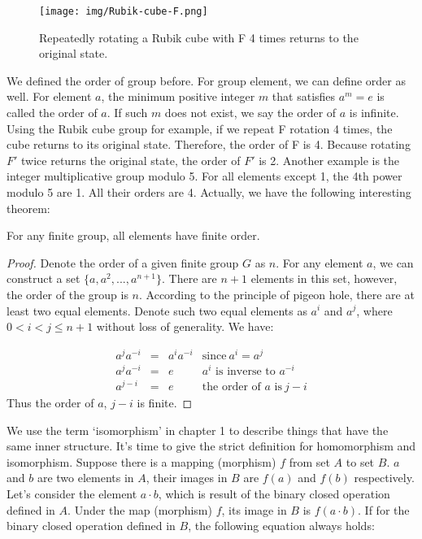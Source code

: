 \documentclass[b5paper]{article}
\begin{document}
\begin{figure}[htbp]
 \centering
 \texttt{[image: img/Rubik-cube-F.png]}
 \caption{Repeatedly rotating a Rubik cube with F 4 times returns to the original state.}
 \label{fig:Rubik-cube-F}
\end{figure}

We defined the order of group before. For group element, we can define order as well. For element $a$, the minimum positive integer $m$ that satisfies $a^m = e$ is called the order of $a$. If such $m$ does not exist, we say the order of $a$ is infinite. Using the Rubik cube group for example, if we repeat F rotation 4 times, the cube returns to its original state. Therefore, the order of F is 4. Because rotating $F'$ twice returns the original state, the order of $F'$ is 2. Another example is the integer multiplicative group modulo 5. For all elements except 1, the 4th power modulo 5 are 1. All their orders are 4. Actually, we have the following interesting theorem:

\begin{theorem}
For any finite group, all elements have finite order.
\end{theorem}

\begin{proof}
Denote the order of a given finite group $G$ as $n$. For any element $a$, we can construct a set $\{a, a^2, ..., a^{n+1}\}$. There are $n + 1$ elements in this set, however, the order of the group is $n$. According to the principle of pigeon hole, there are at least two equal elements. Denote such two equal elements as $a^i$ and $a^j$, where $0 < i < j \leq n + 1$ without loss of generality. We have:

\[
\begin{array}{rcll}
a^ja^{-i} & = & a^{i}a^{-i} & \text{since}\ a^i = a^j \\
a^ja^{-i} & = & e & \text{$a^i$ is inverse to $a^{-i}$} \\
a^{j-i} & = & e & \text{the order of $a$ is}\ j - i
\end{array}
\]
Thus the order of $a$, $j - i$ is finite.
\end{proof}

We use the term `isomorphism' in chapter 1 to describe things that have the same inner structure. It's time to give the strict definition for homomorphism and isomorphism. Suppose there is a mapping (morphism) $f$ from set $A$ to set $B$. $a$ and $b$ are two elements in $A$, their images in $B$ are $f(a)$ and $f(b)$ respectively. Let's consider the element $a \cdot b$, which is result of the binary closed operation defined in $A$. Under the map (morphism) $f$, its image in $B$ is $f(a \cdot b)$. If for the binary closed operation defined in $B$, the following equation always holds:
\end{document}
